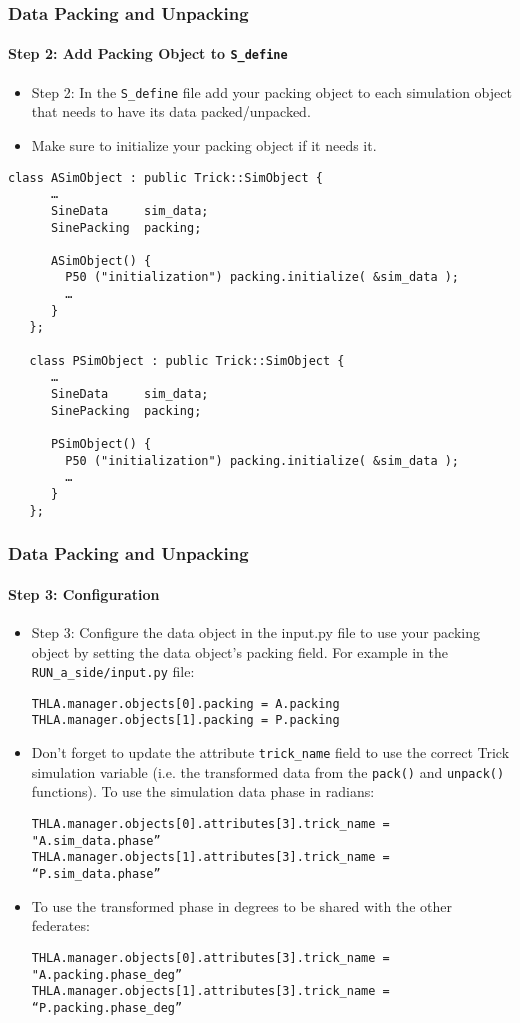    \begin{frame}[fragile]
      \frametitle{Data Packing and Unpacking}
      \framesubtitle{Step 2: Add Packing Object to \texttt{S\_define}}
      \begin{itemize}
         \item Step 2: In the \texttt{S\_define} file add your packing object
         to each simulation object that needs to have its data packed/unpacked.
         \item Make sure to initialize your packing object if it needs it.
      \end{itemize}
\begin{Verbatim}[frame=single, fontsize=\tiny]
   class ASimObject : public Trick::SimObject {
      …
      SineData     sim_data;
      SinePacking  packing;

      ASimObject() {
        P50 ("initialization") packing.initialize( &sim_data );
        …
      }
   };

   class PSimObject : public Trick::SimObject {
      …
      SineData     sim_data;
      SinePacking  packing;

      PSimObject() {
        P50 ("initialization") packing.initialize( &sim_data );
        …
      }
   };
\end{Verbatim}
   \end{frame}

   \begin{frame}[fragile]
      \frametitle{Data Packing and Unpacking}
      \framesubtitle{Step 3: Configuration}
      \begin{itemize}
         \item Step 3: Configure the data object in the input.py file to use
         your packing object by setting the data object’s packing field. For
         example in the \texttt{RUN\_a\_side/input.py} file:
\begin{Verbatim}[frame=single, fontsize=\scriptsize]
THLA.manager.objects[0].packing = A.packing
THLA.manager.objects[1].packing = P.packing
\end{Verbatim}
         \item Don’t forget to update the attribute \texttt{trick\_name} field
         to use the correct Trick simulation variable (i.e. the transformed
         data from the \texttt{pack()} and \texttt{unpack()} functions).
   To use the simulation data phase in radians:
\begin{Verbatim}[frame=single, fontsize=\scriptsize]
THLA.manager.objects[0].attributes[3].trick_name = "A.sim_data.phase”
THLA.manager.objects[1].attributes[3].trick_name = “P.sim_data.phase”
\end{Verbatim}
         \item To use the transformed phase in degrees to be shared with the
         other federates:
\begin{Verbatim}[frame=single, fontsize=\scriptsize]
THLA.manager.objects[0].attributes[3].trick_name = "A.packing.phase_deg”
THLA.manager.objects[1].attributes[3].trick_name = “P.packing.phase_deg”
\end{Verbatim}
      \end{itemize}
   \end{frame}

